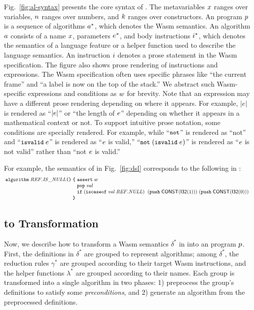 Fig.~\ref{fig:al-syntax} presents the core syntax of \al.
The metavariables $x$ ranges over variables,
$n$ ranges over numbers, and
$k$ ranges over constructors.
An \al program $p$ is a sequence of algorithms $a^*$,
which denotes the Wasm semantics.
An algorithm $a$ consists of a name $x$, parameters $e^*$,
and body instructions $i^*$, which denotes the semantics of a
language feature or a helper function used to describe the language semantics.
An instruction $i$ denotes a prose statement in the Wasm specification.
The figure also shows prose rendering of instructions and expressions.
The Wasm specification often uses specific phrases like ``the current frame'' and 
``a label is now on the top of the stack.''
We abstract such Wasm-specific expressions and conditions as $w$ for brevity.
Note that an \al expression may have a different prose rendering
depending on where it appears. For example, $|e|$ is rendered as 
``$|e|$'' or ``the length of $e$'' depending on whether it appears in
a mathematical context or not.
To support intuitive prose notation, some \al conditions are specially rendered.
For example, while ``$\texttt{\small not}$'' is rendered as ``not'' and ``$\texttt{\small isvalid}\;e$''
is rendered as ``$e$ is valid,''
``$\texttt{\small not} \; (\texttt{\small isvalid} \; e)$'' is rendered as ``$e$ is not valid''
rather than ``not $e$ is valid.''

For example, the semantics of 
in Fig.~\ref{fig:dsl} corresponds to the following in \al:
\[
\small
\!\!
\begin{array}{r@{~}l}
\kwalg \; \mathit{REF.IS\_NULL} \kwrl \kwrr \; \kwcl &
  \kwassert \; \wasmc \\
& \kwpop \; \mathit{val}\\
& \kwif \; (\kwiscaseof \; \mathit{val} \; \mathit{REF.NULL})\;
\; (\kwpush \; \ssf{CONST}(\ssf{I32}(1))) \; (\kwpush \; \ssf{CONST}(\ssf{I32}(0)))\\
\kwcr
\end{array}
\]

\subsection{\dl to \al Transformation}\label{sec:dl2al}
Now, we describe how to transform a Wasm semantics $\delta^*$ in \dl into an \al program $p$.
First, the definitions in $\delta^*$ are grouped to represent algorithms; among $\delta^*$,
the reduction rules $\gamma^*$ are grouped according to their target Wasm instructions, and
the helper functions $\lambda^*$ are grouped according to their names.
Each group is transformed into a single algorithm in two phases:
1) preprocess the group's definitions to satisfy some \textit{preconditions}, and
2) generate an \al algorithm from the preprocessed \dl definitions.

